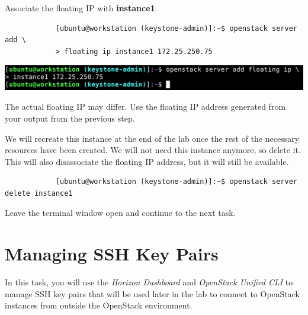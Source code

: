 \documentclass[letterpaper, 12pt]{article}
\begin{document}
\begin{enumerate}
    \begin{labstep}
        Associate the floating IP with \textbf{instance1}.
        \begin{lstlisting}
            [ubuntu@workstation (keystone-admin)]:~$ openstack server add \
            > floating ip instance1 172.25.250.75
        \end{lstlisting}

        \begin{center}
            \includegraphics[width=\linewidth]{images/part3/step12.png}
        \end{center}
    \end{labstep}

    \begin{notebox}
        The actual floating IP may differ.
        Use the floating IP address generated from your output from the previous step.
    \end{notebox}

    \begin{labstep}
        We will recreate this instance at the end of the lab once the rest of the necessary resources have been created.
        We will not need this instance anymore, so delete it.
        This will also disassociate the floating IP address, but it will still be available.
        \begin{lstlisting}
            [ubuntu@workstation (keystone-admin)]:~$ openstack server delete instance1
        \end{lstlisting}
    \end{labstep}

    \begin{labstep}
        Leave the terminal window open and continue to the next task.
    \end{labstep}

\end{enumerate}

\section{Managing SSH Key Pairs}\label{sec:managing_ssh_key_pairs}
In this task, you will use the \textit{Horizon Dashboard} and \textit{OpenStack Unified CLI} to manage SSH key pairs that will be used later in the lab to connect to OpenStack instances from outside the OpenStack environment.
\end{document}
